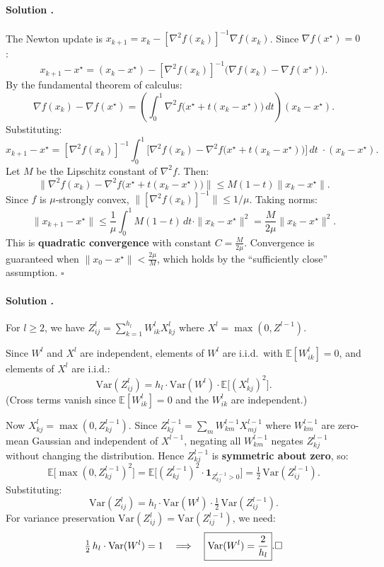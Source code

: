\documentclass{article}
\newcounter{solutionCount}
\newcommand{\solution}[1]{
    \stepcounter{solutionCount}
    \paragraph{Solution \thesolutionCount.}
    {
        #1
    }
}
\begin{document}
\solution{
    The Newton update is $x_{k+1} = x_k - [\nabla^2 f(x_k)]^{-1}\nabla f(x_k)$. Since $\nabla f(x^\star)=0$:
    \[
    x_{k+1} - x^\star = (x_k - x^\star) - [\nabla^2 f(x_k)]^{-1}\!\big(\nabla f(x_k) - \nabla f(x^\star)\big).
    \]
    By the fundamental theorem of calculus:
    \[
    \nabla f(x_k)-\nabla f(x^\star) = \left(\int_0^1 \nabla^2 f\!\big(x^\star + t(x_k-x^\star)\big)\,dt\right)(x_k-x^\star).
    \]
    Substituting:
    \[
    x_{k+1}-x^\star = [\nabla^2 f(x_k)]^{-1}\!\int_0^1 \!\big[\nabla^2 f(x_k) - \nabla^2 f\!\big(x^\star\!+t(x_k\!-\!x^\star)\big)\big]\,dt\;\cdot(x_k-x^\star).
    \]
    Let $M$ be the Lipschitz constant of $\nabla^2 f$. Then:
    \[
    \big\|\nabla^2 f(x_k) - \nabla^2 f\!\big(x^\star+t(x_k-x^\star)\big)\big\| \le M(1-t)\|x_k-x^\star\|.
    \]
    Since $f$ is $\mu$-strongly convex, $\|[\nabla^2 f(x_k)]^{-1}\|\le 1/\mu$. Taking norms:
    \[
    \|x_{k+1}-x^\star\| \le \frac{1}{\mu}\int_0^1 M(1-t)\,dt\cdot\|x_k-x^\star\|^2 = \frac{M}{2\mu}\|x_k-x^\star\|^2.
    \]
    This is \textbf{quadratic convergence} with constant $C=\frac{M}{2\mu}$. Convergence is guaranteed when $\|x_0-x^\star\|<\frac{2\mu}{M}$, which holds by the ``sufficiently close'' assumption. \hfill$\square$
}

\solution{
    For $l\ge 2$, we have $Z^l_{ij}=\sum_{k=1}^{h_l}W^l_{ik}X^l_{kj}$ where $X^l=\max(0,Z^{l-1})$.

    Since $W^l$ and $X^l$ are independent, elements of $W^l$ are i.i.d.\ with $\mathbb{E}[W^l_{ik}]=0$, and elements of $X^l$ are i.i.d.:
    \[
    \mathrm{Var}(Z^l_{ij}) = h_l \cdot \mathrm{Var}(W^l)\cdot\mathbb{E}\!\big[(X^l_{kj})^2\big].
    \]
    (Cross terms vanish since $\mathbb{E}[W^l_{ik}]=0$ and the $W^l_{ik}$ are independent.)

    Now $X^l_{kj}=\max(0,Z^{l-1}_{kj})$. Since $Z^{l-1}_{kj}=\sum_m W^{l-1}_{km}X^{l-1}_{mj}$ where $W^{l-1}_{km}$ are zero-mean Gaussian and independent of $X^{l-1}$, negating all $W^{l-1}_{km}$ negates $Z^{l-1}_{kj}$ without changing the distribution. Hence $Z^{l-1}_{kj}$ is \textbf{symmetric about zero}, so:
    \[
    \mathbb{E}\!\big[\max(0,Z^{l-1}_{kj})^2\big]
    = \mathbb{E}\!\big[(Z^{l-1}_{kj})^2\cdot\mathbf{1}_{Z^{l-1}_{kj}>0}\big]
    = \tfrac{1}{2}\,\mathrm{Var}(Z^{l-1}_{ij}).
    \]
    Substituting:
    \[
    \mathrm{Var}(Z^l_{ij}) = h_l\cdot\mathrm{Var}(W^l)\cdot\tfrac{1}{2}\,\mathrm{Var}(Z^{l-1}_{ij}).
    \]
    For variance preservation $\mathrm{Var}(Z^l_{ij})=\mathrm{Var}(Z^{l-1}_{ij})$, we need:
    \[
    \tfrac{1}{2}\,h_l\cdot\mathrm{Var}(W^l)=1
    \quad\Longrightarrow\quad
    \boxed{\mathrm{Var}(W^l)=\frac{2}{h_l}}.  \hfill\square
    \]
}
\end{document}
